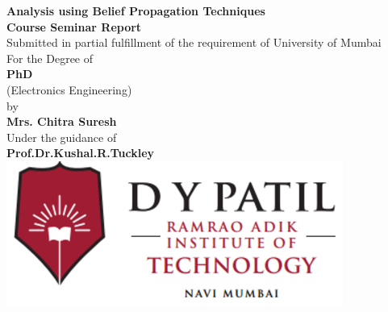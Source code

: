 \clearpage%
\begin{center}
{\Huge \bf Analysis using Belief Propagation Techniques } \\
\vspace{0.4in}
\textbf {\large Course Seminar Report} \\
\vspace{0.3in}
\large Submitted in partial fulfillment of the requirement of University of Mumbai\\
For the Degree of\\
\vspace{0.5in}
\textbf {PhD}\\
\large(Electronics Engineering)\\
\vspace{0.4in}
\large by\\
\vspace{0.2in}
{\large \bf Mrs. Chitra Suresh}\\
\vspace{0.3in}
\large Under the guidance of\\
\vspace{0.2in}
{\large \bf{Prof.Dr.Kushal.R.Tuckley}\\
\vspace{0.6in}
\includegraphics{raitlogo.eps}\\
}
\end{center}
